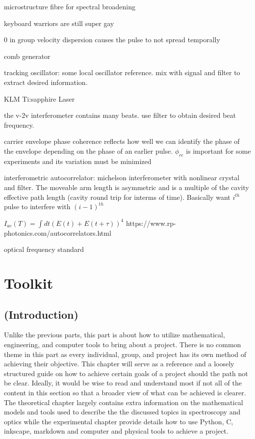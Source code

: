\documentclass[11pt,a4paper]{book}
\begin{document}
microstructure fibre for spectral broadening

keyboard warriors are still super gay

0 in group velocity dispersion causes the pulse to not spread temporally

comb generator

tracking oscillator: some local oscillator reference. mix with signal and filter to extract desired information.

KLM Ti:sapphire Laser

the v-2v interferometer contains many beats. use filter to obtain desired beat frequency.

carrier envelope phase coherence reflects how well we can identify the phase of the envelope depending on the phase of an earlier pulse. $\phi_{ce}$ is important for some experiments and its variation must be minimized 

interferometric autocorrelator: michelson interferometer with nonlinear crystal and filter. The moveable arm length is asymmetric and is a multiple of the cavity effective path length (cavity round trip for interms of time). Basically want $i^{th}$ pulse to interfere with $(i-1)^{th}$ 

$\displaystyle I_{ac}(T) = \int dt\left( E(t) + E(t + \tau ) \right)^4 $
https://www.rp-photonics.com/autocorrelators.html

optical frequency standard

\part{Toolkit}
\chapter*{(Introduction)}
	Unlike the previous parts, this part is about how to utilize mathematical, engineering, and computer tools to bring about a project. There is no common theme in this part as every individual, group, and project has its own method of achieving their objective. This chapter will serve as a reference and a loosely structured guide on how to achieve certain goals of a project should the path not be clear. Ideally, it would be wise to read and understand most if not all of the content in this section so that a broader view of what can be achieved is clearer. The theoretical chapter largely contains extra information on the mathematical models and tools used to describe the the discussed topics in spectroscopy and optics while the experimental chapter provide details how to use Python, C, inkscape, markdown and computer and physical tools to achieve a project.
\end{document}
